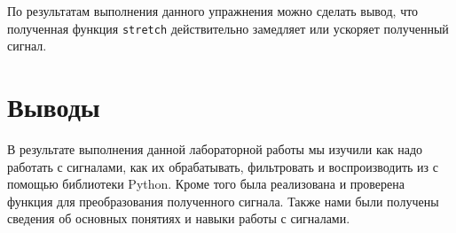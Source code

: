 \documentclass[a4]{article}
\begin{document}
    По результатам выполнения данного упражнения можно сделать вывод, что полученная функция \texttt{stretch} действительно замедляет или ускоряет полученный сигнал.

    \newpage


    \section{Выводы}
    \label{sec:conclusions}
    В результате выполнения данной лабораторной работы мы изучили как надо работать с сигналами, как их обрабатывать, фильтровать и воспроизводить из с помощью библиотеки Python.
    Кроме того была реализована и проверена функция для преобразования полученного сигнала.
    Также нами были получены сведения об основных понятиях и навыки работы с сигналами.
\end{document}
